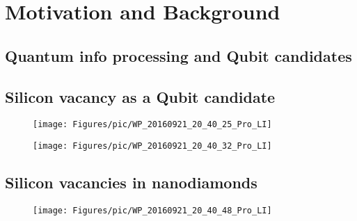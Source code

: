 
\chapter[Motivation and Background]
{Motivation and Background} %

\label{Chapter1} %







\newcommand{\keyword}[1]{\textbf{#1}}
\newcommand{\tabhead}[1]{\textbf{#1}}
\newcommand{\code}[1]{\texttt{#1}}
\newcommand{\file}[1]{\texttt{\bfseries#1}}
\newcommand{\option}[1]{\texttt{\itshape#1}}


\section[Quantum info processing and Qubit candidates]{Quantum info processing and Qubit candidates}



\section[Silicon vacancy as a Qubit candidate]{Silicon vacancy as a Qubit candidate}

\FloatBarrier
\begin{figure}[h]
\centering
\texttt{[image: Figures/pic/WP\_20160921\_20\_40\_25\_Pro\_LI]}
\caption{}
\label{fig:wp20160921204025proli}
\end{figure}
\FloatBarrier

\begin{figure}[h]
\centering
\texttt{[image: Figures/pic/WP\_20160921\_20\_40\_32\_Pro\_LI]}
\caption{}
\label{fig:wp20160921204032proli}
\end{figure}
\FloatBarrier


\section[Silicon vacancies in nanodiamonds]{Silicon vacancies in nanodiamonds}
\FloatBarrier
\begin{figure}[h]
\centering
\texttt{[image: Figures/pic/WP\_20160921\_20\_40\_48\_Pro\_LI]}
\caption{}
\label{fig:wp20160921204048proli}
\end{figure}
\FloatBarrier

